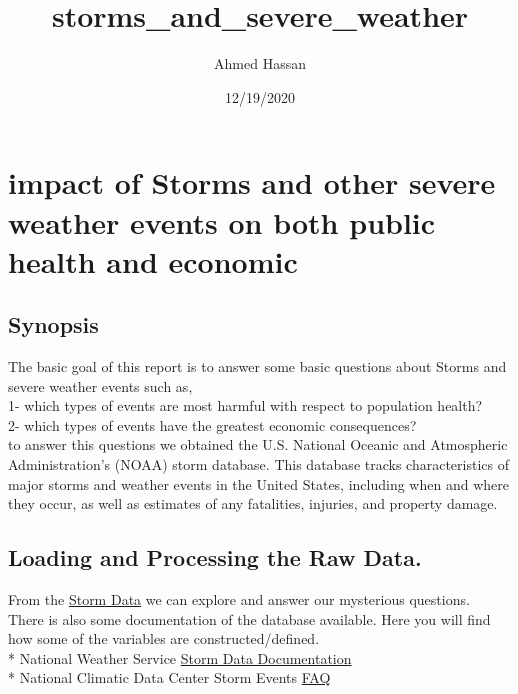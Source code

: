 \documentclass[
]{article}
\title{storms\_and\_severe\_weather}
\author{Ahmed Hassan}
\date{12/19/2020}
\begin{document}
\maketitle

\hypertarget{impact-of-storms-and-other-severe-weather-events-on-both-public-health-and-economic}{%
\section{impact of Storms and other severe weather events on both public
health and
economic}\label{impact-of-storms-and-other-severe-weather-events-on-both-public-health-and-economic}}

\hypertarget{synopsis}{%
\subsection{Synopsis}\label{synopsis}}

The basic goal of this report is to answer some basic questions about
Storms and severe weather events such as,\\
1- which types of events are most harmful with respect to population
health?\\
2- which types of events have the greatest economic consequences?\\
to answer this questions we obtained the U.S. National Oceanic and
Atmospheric Administration's (NOAA) storm database. This database tracks
characteristics of major storms and weather events in the United States,
including when and where they occur, as well as estimates of any
fatalities, injuries, and property damage.

\hypertarget{loading-and-processing-the-raw-data.}{%
\subsection{Loading and Processing the Raw
Data.}\label{loading-and-processing-the-raw-data.}}

From the
\href{https://d396qusza40orc.cloudfront.net/repdata\%2Fdata\%2FStormData.csv.bz2}{Storm
Data} we can explore and answer our mysterious questions.\\
There is also some documentation of the database available. Here you
will find how some of the variables are constructed/defined.\\
* National Weather Service
\href{https://d396qusza40orc.cloudfront.net/repdata\%2Fpeer2_doc\%2Fpd01016005curr.pdf}{Storm
Data Documentation}\\
* National Climatic Data Center Storm Events
\href{https://d396qusza40orc.cloudfront.net/repdata\%2Fpeer2_doc\%2FNCDC\%20Storm\%20Events-FAQ\%20Page.pdf}{FAQ}
\end{document}
